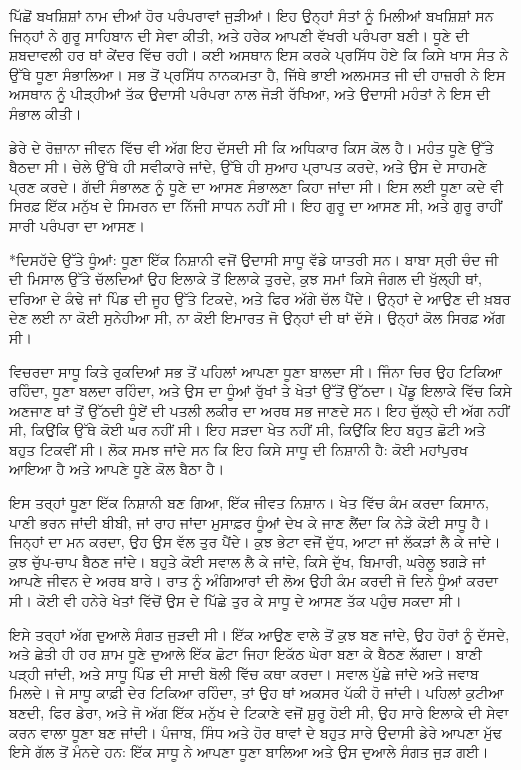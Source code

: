 \documentclass[12pt,a5paper,twoside]{book}  %
\makeatletter
\renewcommand\section{\@startsection{section}{1}{0pt}{1.2em}{0.6em}{\punjabifont\Large\bfseries}}%
\makeatother
\begin{document}
{ਪਿੱਛੋਂ ਬਖਸ਼ਿਸ਼ਾਂ ਨਾਮ ਦੀਆਂ ਹੋਰ ਪਰੰਪਰਾਵਾਂ ਜੁੜੀਆਂ। ਇਹ ਉਨ੍ਹਾਂ ਸੰਤਾਂ ਨੂੰ ਮਿਲੀਆਂ ਬਖਸ਼ਿਸ਼ਾਂ ਸਨ ਜਿਨ੍ਹਾਂ ਨੇ ਗੁਰੂ ਸਾਹਿਬਾਨ ਦੀ ਸੇਵਾ ਕੀਤੀ, ਅਤੇ ਹਰੇਕ ਆਪਣੀ ਵੱਖਰੀ ਪਰੰਪਰਾ ਬਣੀ। ਧੂਣੇ ਦੀ ਸ਼ਬਦਾਵਲੀ ਹਰ ਥਾਂ ਕੇਂਦਰ ਵਿੱਚ ਰਹੀ। ਕਈ ਅਸਥਾਨ ਇਸ ਕਰਕੇ ਪ੍ਰਸਿੱਧ ਹੋਏ ਕਿ ਕਿਸੇ ਖਾਸ ਸੰਤ ਨੇ ਉੱਥੇ ਧੂਣਾ ਸੰਭਾਲਿਆ। ਸਭ ਤੋਂ ਪ੍ਰਸਿੱਧ ਨਾਨਕਮਤਾ ਹੈ, ਜਿੱਥੇ ਭਾਈ ਅਲਮਸਤ ਜੀ ਦੀ ਹਾਜ਼ਰੀ ਨੇ ਇਸ ਅਸਥਾਨ ਨੂੰ ਪੀੜ੍ਹੀਆਂ ਤੱਕ ਉਦਾਸੀ ਪਰੰਪਰਾ ਨਾਲ ਜੋੜੀ ਰੱਖਿਆ, ਅਤੇ ਉਦਾਸੀ ਮਹੰਤਾਂ ਨੇ ਇਸ ਦੀ ਸੰਭਾਲ ਕੀਤੀ।

ਡੇਰੇ ਦੇ ਰੋਜ਼ਾਨਾ ਜੀਵਨ ਵਿੱਚ ਵੀ ਅੱਗ ਇਹ ਦੱਸਦੀ ਸੀ ਕਿ ਅਧਿਕਾਰ ਕਿਸ ਕੋਲ ਹੈ। ਮਹੰਤ ਧੂਣੇ ਉੱਤੇ ਬੈਠਦਾ ਸੀ। ਚੇਲੇ ਉੱਥੇ ਹੀ ਸਵੀਕਾਰੇ ਜਾਂਦੇ, ਉੱਥੇ ਹੀ ਸੁਆਹ ਪ੍ਰਾਪਤ ਕਰਦੇ, ਅਤੇ ਉਸ ਦੇ ਸਾਹਮਣੇ ਪ੍ਰਣ ਕਰਦੇ। ਗੱਦੀ ਸੰਭਾਲਣ ਨੂੰ ਧੂਣੇ ਦਾ ਆਸਣ ਸੰਭਾਲਣਾ ਕਿਹਾ ਜਾਂਦਾ ਸੀ। ਇਸ ਲਈ ਧੂਣਾ ਕਦੇ ਵੀ ਸਿਰਫ਼ ਇੱਕ ਮਨੁੱਖ ਦੇ ਸਿਮਰਨ ਦਾ ਨਿੱਜੀ ਸਾਧਨ ਨਹੀਂ ਸੀ। ਇਹ ਗੁਰੂ ਦਾ ਆਸਣ ਸੀ, ਅਤੇ ਗੁਰੂ ਰਾਹੀਂ ਸਾਰੀ ਪਰੰਪਰਾ ਦਾ ਆਸਣ।


\section*{ਦਿਸਹੱਦੇ ਉੱਤੇ ਧੂੰਆਂ: ਧੂਣਾ ਇੱਕ ਨਿਸ਼ਾਨੀ ਵਜੋਂ}
ਉਦਾਸੀ ਸਾਧੂ ਵੱਡੇ ਯਾਤਰੀ ਸਨ। ਬਾਬਾ ਸ੍ਰੀ ਚੰਦ ਜੀ ਦੀ ਮਿਸਾਲ ਉੱਤੇ ਚੱਲਦਿਆਂ ਉਹ ਇਲਾਕੇ ਤੋਂ ਇਲਾਕੇ ਤੁਰਦੇ, ਕੁਝ ਸਮਾਂ ਕਿਸੇ ਜੰਗਲ ਦੀ ਖੁੱਲ੍ਹੀ ਥਾਂ, ਦਰਿਆ ਦੇ ਕੰਢੇ ਜਾਂ ਪਿੰਡ ਦੀ ਜੂਹ ਉੱਤੇ ਟਿਕਦੇ, ਅਤੇ ਫਿਰ ਅੱਗੇ ਚੱਲ ਪੈਂਦੇ। ਉਨ੍ਹਾਂ ਦੇ ਆਉਣ ਦੀ ਖ਼ਬਰ ਦੇਣ ਲਈ ਨਾ ਕੋਈ ਸੁਨੇਹੀਆ ਸੀ, ਨਾ ਕੋਈ ਇਮਾਰਤ ਜੋ ਉਨ੍ਹਾਂ ਦੀ ਥਾਂ ਦੱਸੇ। ਉਨ੍ਹਾਂ ਕੋਲ ਸਿਰਫ਼ ਅੱਗ ਸੀ।

ਵਿਚਰਦਾ ਸਾਧੂ ਕਿਤੇ ਰੁਕਦਿਆਂ ਸਭ ਤੋਂ ਪਹਿਲਾਂ ਆਪਣਾ ਧੂਣਾ ਬਾਲਦਾ ਸੀ। ਜਿੰਨਾ ਚਿਰ ਉਹ ਟਿਕਿਆ ਰਹਿੰਦਾ, ਧੂਣਾ ਬਲਦਾ ਰਹਿੰਦਾ, ਅਤੇ ਉਸ ਦਾ ਧੂੰਆਂ ਰੁੱਖਾਂ ਤੇ ਖੇਤਾਂ ਉੱਤੋਂ ਉੱਠਦਾ। ਪੇਂਡੂ ਇਲਾਕੇ ਵਿੱਚ ਕਿਸੇ ਅਣਜਾਣ ਥਾਂ ਤੋਂ ਉੱਠਦੀ ਧੂੰਏਂ ਦੀ ਪਤਲੀ ਲਕੀਰ ਦਾ ਅਰਥ ਸਭ ਜਾਣਦੇ ਸਨ। ਇਹ ਚੁੱਲ੍ਹੇ ਦੀ ਅੱਗ ਨਹੀਂ ਸੀ, ਕਿਉਂਕਿ ਉੱਥੇ ਕੋਈ ਘਰ ਨਹੀਂ ਸੀ। ਇਹ ਸੜਦਾ ਖੇਤ ਨਹੀਂ ਸੀ, ਕਿਉਂਕਿ ਇਹ ਬਹੁਤ ਛੋਟੀ ਅਤੇ ਬਹੁਤ ਟਿਕਵੀਂ ਸੀ। ਲੋਕ ਸਮਝ ਜਾਂਦੇ ਸਨ ਕਿ ਇਹ ਕਿਸੇ ਸਾਧੂ ਦੀ ਨਿਸ਼ਾਨੀ ਹੈ: ਕੋਈ ਮਹਾਂਪੁਰਖ ਆਇਆ ਹੈ ਅਤੇ ਆਪਣੇ ਧੂਣੇ ਕੋਲ ਬੈਠਾ ਹੈ।

ਇਸ ਤਰ੍ਹਾਂ ਧੂਣਾ ਇੱਕ ਨਿਸ਼ਾਨੀ ਬਣ ਗਿਆ, ਇੱਕ ਜੀਵਤ ਨਿਸ਼ਾਨ। ਖੇਤ ਵਿੱਚ ਕੰਮ ਕਰਦਾ ਕਿਸਾਨ, ਪਾਣੀ ਭਰਨ ਜਾਂਦੀ ਬੀਬੀ, ਜਾਂ ਰਾਹ ਜਾਂਦਾ ਮੁਸਾਫ਼ਰ ਧੂੰਆਂ ਦੇਖ ਕੇ ਜਾਣ ਲੈਂਦਾ ਕਿ ਨੇੜੇ ਕੋਈ ਸਾਧੂ ਹੈ। ਜਿਨ੍ਹਾਂ ਦਾ ਮਨ ਕਰਦਾ, ਉਹ ਉਸ ਵੱਲ ਤੁਰ ਪੈਂਦੇ। ਕੁਝ ਭੇਟਾ ਵਜੋਂ ਦੁੱਧ, ਆਟਾ ਜਾਂ ਲੱਕੜਾਂ ਲੈ ਕੇ ਜਾਂਦੇ। ਕੁਝ ਚੁੱਪ-ਚਾਪ ਬੈਠਣ ਜਾਂਦੇ। ਬਹੁਤੇ ਕੋਈ ਸਵਾਲ ਲੈ ਕੇ ਜਾਂਦੇ, ਕਿਸੇ ਦੁੱਖ, ਬਿਮਾਰੀ, ਘਰੇਲੂ ਝਗੜੇ ਜਾਂ ਆਪਣੇ ਜੀਵਨ ਦੇ ਅਰਥ ਬਾਰੇ। ਰਾਤ ਨੂੰ ਅੰਗਿਆਰਾਂ ਦੀ ਲੋਅ ਉਹੀ ਕੰਮ ਕਰਦੀ ਜੋ ਦਿਨੇ ਧੂੰਆਂ ਕਰਦਾ ਸੀ। ਕੋਈ ਵੀ ਹਨੇਰੇ ਖੇਤਾਂ ਵਿੱਚੋਂ ਉਸ ਦੇ ਪਿੱਛੇ ਤੁਰ ਕੇ ਸਾਧੂ ਦੇ ਆਸਣ ਤੱਕ ਪਹੁੰਚ ਸਕਦਾ ਸੀ।

ਇਸੇ ਤਰ੍ਹਾਂ ਅੱਗ ਦੁਆਲੇ ਸੰਗਤ ਜੁੜਦੀ ਸੀ। ਇੱਕ ਆਉਣ ਵਾਲੇ ਤੋਂ ਕੁਝ ਬਣ ਜਾਂਦੇ, ਉਹ ਹੋਰਾਂ ਨੂੰ ਦੱਸਦੇ, ਅਤੇ ਛੇਤੀ ਹੀ ਹਰ ਸ਼ਾਮ ਧੂਣੇ ਦੁਆਲੇ ਇੱਕ ਛੋਟਾ ਜਿਹਾ ਇਕੱਠ ਘੇਰਾ ਬਣਾ ਕੇ ਬੈਠਣ ਲੱਗਦਾ। ਬਾਣੀ ਪੜ੍ਹੀ ਜਾਂਦੀ, ਅਤੇ ਸਾਧੂ ਪਿੰਡ ਦੀ ਸਾਦੀ ਬੋਲੀ ਵਿੱਚ ਕਥਾ ਕਰਦਾ। ਸਵਾਲ ਪੁੱਛੇ ਜਾਂਦੇ ਅਤੇ ਜਵਾਬ ਮਿਲਦੇ। ਜੇ ਸਾਧੂ ਕਾਫ਼ੀ ਦੇਰ ਟਿਕਿਆ ਰਹਿੰਦਾ, ਤਾਂ ਉਹ ਥਾਂ ਅਕਸਰ ਪੱਕੀ ਹੋ ਜਾਂਦੀ। ਪਹਿਲਾਂ ਕੁਟੀਆ ਬਣਦੀ, ਫਿਰ ਡੇਰਾ, ਅਤੇ ਜੋ ਅੱਗ ਇੱਕ ਮਨੁੱਖ ਦੇ ਟਿਕਾਣੇ ਵਜੋਂ ਸ਼ੁਰੂ ਹੋਈ ਸੀ, ਉਹ ਸਾਰੇ ਇਲਾਕੇ ਦੀ ਸੇਵਾ ਕਰਨ ਵਾਲਾ ਧੂਣਾ ਬਣ ਜਾਂਦੀ। ਪੰਜਾਬ, ਸਿੰਧ ਅਤੇ ਹੋਰ ਥਾਵਾਂ ਦੇ ਬਹੁਤ ਸਾਰੇ ਉਦਾਸੀ ਡੇਰੇ ਆਪਣਾ ਮੁੱਢ ਇਸੇ ਗੱਲ ਤੋਂ ਮੰਨਦੇ ਹਨ: ਇੱਕ ਸਾਧੂ ਨੇ ਆਪਣਾ ਧੂਣਾ ਬਾਲਿਆ ਅਤੇ ਉਸ ਦੁਆਲੇ ਸੰਗਤ ਜੁੜ ਗਈ।

}
\end{document}
